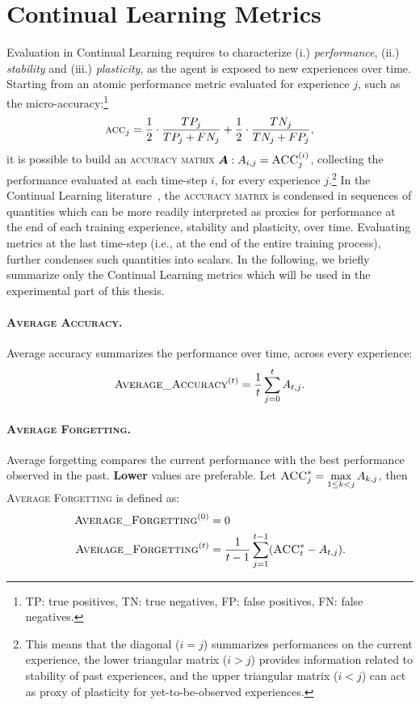 \section{Continual Learning Metrics}
Evaluation in Continual Learning requires to characterize (i.) \textit{performance}, (ii.) \textit{stability} and (iii.) \textit{plasticity}, as the agent is exposed to new experiences over time.
Starting from an atomic performance metric evaluated for experience $j$, such as the micro-accuracy:\footnote{TP: true positives, TN: true negatives, FP: false positives, FN: false negatives.}
\begin{equation*}
	\textsc{acc}_j = \frac{1}{2}\cdot \frac{TP_j}{TP_j + FN_j} + \frac{1}{2}\cdot \frac{TN_j}{TN_j + FP_j},
\end{equation*}
it is possible to build an \textsc{accuracy matrix} ${\bm{A}}: {A}_{i,j} = \textsc{ACC}^{(i)}_j$, collecting the performance evaluated at each time-step $i$, for every experience $j$.\footnote{This means that the diagonal ($i = j$) summarizes performances on the current experience, the lower triangular matrix ($i > j$) provides information related to stability of past experiences, and the upper triangular matrix ($i < j$) can act as proxy of plasticity for yet-to-be-observed experiences.}
In the Continual Learning literature~\cite{wang2023comprehensive,mai2022online}, the \textsc{accuracy matrix} is condensed in sequences of quantities which can be more readily interpreted as proxies for performance at the end of each training experience, stability and plasticity, over time. Evaluating metrics at the last time-step (i.e., at the end of the entire training process), further condenses such quantities into scalars.
In the following, we briefly summarize only the Continual Learning metrics which will be used in the experimental part of this thesis.
\paragraph{\textsc{Average Accuracy}.} Average accuracy summarizes the performance over time, across every experience:
\begin{equation*}
	\textsc{Average\_Accuracy}^{(t)} = \frac{1}{t} \sum_{j=0}^t {A}_{t,j}.
\end{equation*}

\paragraph{\textsc{Average Forgetting}.} Average forgetting compares the current performance with the best performance observed in the past. \textbf{Lower} values are preferable. Let $\textsc{ACC}^*_j = \displaystyle\max_{1 \leq k < j} {A}_{k,j}$, then \textsc{Average Forgetting} is defined as:
\begin{align*}
	\textsc{Average\_Forgetting}^{(0)} &= 0\\
	\textsc{Average\_Forgetting}^{(t)} &= \frac{1}{t - 1} \sum_{j=1}^{t-1} (\textsc{ACC}^*_t - {A}_{t,j}).
\end{align*}

